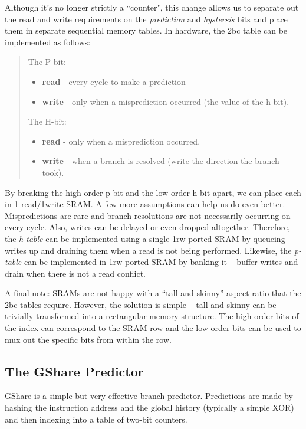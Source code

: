 Although it's no longer strictly a ``counter", this change allows us to separate out the read and write requirements on the {\em prediction} and {\em hystersis} bits and place them in separate sequential memory tables. In hardware, the 2bc table can be implemented as follows:

\begin{quote}
The P-bit:
\begin{itemize}
\item {\bf read} - every cycle to make a prediction
\item {\bf write} - only when a misprediction occurred (the value of the h-bit).
\end{itemize}

The H-bit:

\begin{itemize}
\item {\bf read} - only when a misprediction occurred.
\item {\bf write} - when a branch is resolved (write the direction the branch took).
\end{itemize}
\end{quote}

By breaking the high-order p-bit and the low-order h-bit apart, we can place each in 1 read/1write SRAM. A few more assumptions can help us do even better. Mispredictions are rare and branch resolutions are not necessarily occurring on every cycle. Also, writes can be delayed or even dropped altogether. Therefore, the {\em h-table} can be implemented using a single 1rw ported SRAM by queueing writes up and draining them when a read is not being performed. Likewise, the {\em p-table} can be implemented in 1rw ported SRAM by banking it -- buffer writes and drain when there is not a read conflict.


A final note: SRAMs are not happy with a ``tall and skinny'' aspect ratio that the 2bc tables require. However, the solution is simple -- tall and skinny can be trivially transformed into a rectangular memory structure.  The high-order bits of the index can correspond to the SRAM row and the low-order bits can be used to mux out the specific bits from within the row. 

\subsection{The GShare Predictor}

GShare is a simple but very effective branch predictor. Predictions are made by hashing the instruction address and the global history (typically a simple XOR) and then indexing into a table of two-bit counters. 

